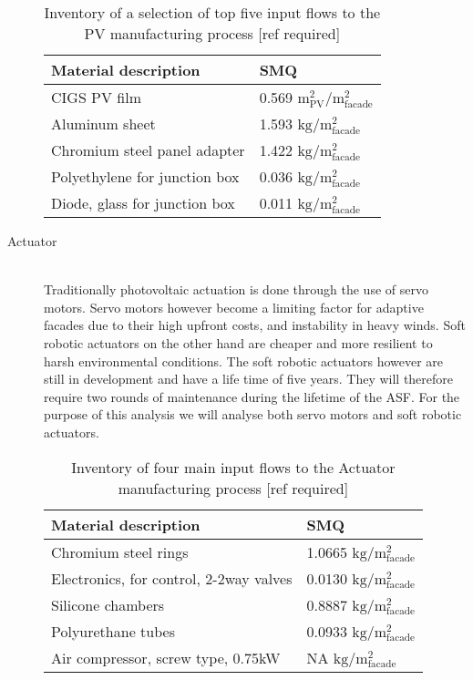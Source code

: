\begin{description}
\begin{table}[H]
\centering
\begin{tabular}{ll}
\hline
Material description & SMQ \\ \hline
CIGS PV film       	 & 0.569 ${\mathrm{m^2_{PV}/m^2_{facade}}}$\\
Aluminum sheet 	 & 1.593 ${\mathrm{kg/m^2_{facade}}}$\\
Chromium steel panel adapter  & 1.422 ${\mathrm{kg/m^2_{facade}}}$\\
Polyethylene for junction box & 0.036 ${\mathrm{kg/m^2_{facade}}}$\\
Diode, glass for junction box & 0.011 ${\mathrm{kg/m^2_{facade}}}$\\
\hline
\end{tabular}
\caption{Inventory of a selection of top five input flows to the PV manufacturing process [ref required]}
\label{tab:PVinv}
\end{table}

\item[Actuator] \hfill \\
Traditionally photovoltaic actuation is done through the use of servo motors. Servo motors however become a limiting factor for adaptive facades due to their high upfront costs, and instability in heavy winds. Soft robotic actuators on the other hand are cheaper and more resilient to harsh environmental conditions\cite{Svetozarevic2014a}. The soft robotic actuators however are still in development and have a life time of five years. They will therefore require two rounds of maintenance during the lifetime of the ASF.
For the purpose of this analysis we will analyse both servo motors and soft robotic actuators. 

\begin{table}[H]
\centering
\begin{tabular}{ll}
\hline
Material description & SMQ \\ \hline
Chromium steel rings	 & 1.0665 ${\mathrm{kg/m^2_{facade}}}$ \\
Electronics, for control, 2-2way valves  & 0.0130  ${\mathrm{kg/m^2_{facade}}}$\\
Silicone chambers & 0.8887 ${\mathrm{kg/m^2_{facade}}}$\\
Polyurethane tubes &0.0933 ${\mathrm{kg/m^2_{facade}}}$\\
Air compressor, screw type, 0.75kW & NA ${\mathrm{kg/m^2_{facade}}}$\\
\hline
\end{tabular}
\caption{Inventory of four main input flows to the Actuator manufacturing process [ref required]}
\label{tab:ActuatorInv}
\end{table}


\end{description}
